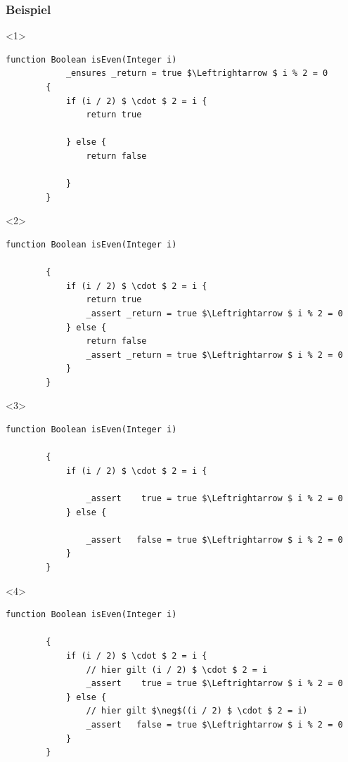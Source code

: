 \documentclass[t,svgnames]{beamer}
\begin{document}
\begin{frame}[fragile]
	\frametitle{Beispiel}
	
	\begin{onlyenv}
	\begin{lstlisting}[frame=lines,mathescape=true]
		function Boolean isEven(Integer i)
		    _ensures _return = true $\Leftrightarrow $ i % 2 = 0
		{
		    if (i / 2) $ \cdot $ 2 = i {
		        return true
		        
		    } else {
		        return false
		        
		    }
		}
	\end{lstlisting}
	\end{onlyenv}
	
	\begin{onlyenv}
	\begin{lstlisting}[frame=lines,mathescape=true]
		function Boolean isEven(Integer i)
		
		{
		    if (i / 2) $ \cdot $ 2 = i {
		        return true
		        _assert _return = true $\Leftrightarrow $ i % 2 = 0
		    } else {
		        return false
		        _assert _return = true $\Leftrightarrow $ i % 2 = 0
		    }
		}
	\end{lstlisting}
	\end{onlyenv}
	
	\begin{onlyenv}
	\begin{lstlisting}[frame=lines,mathescape=true]
		function Boolean isEven(Integer i)
		
		{
		    if (i / 2) $ \cdot $ 2 = i {
		    
		        _assert    true = true $\Leftrightarrow $ i % 2 = 0
		    } else {
		    
		        _assert   false = true $\Leftrightarrow $ i % 2 = 0
		    }
		}
	\end{lstlisting}
	\end{onlyenv}
	
		\begin{onlyenv}<4>
	\begin{lstlisting}[frame=lines,mathescape=true]
		function Boolean isEven(Integer i)
		
		{
		    if (i / 2) $ \cdot $ 2 = i {
		        // hier gilt (i / 2) $ \cdot $ 2 = i
		        _assert    true = true $\Leftrightarrow $ i % 2 = 0
		    } else {
		        // hier gilt $\neg$((i / 2) $ \cdot $ 2 = i)
		        _assert   false = true $\Leftrightarrow $ i % 2 = 0
		    }
		}
	\end{lstlisting}
	\end{onlyenv}
	

\end{frame}
\end{document}
